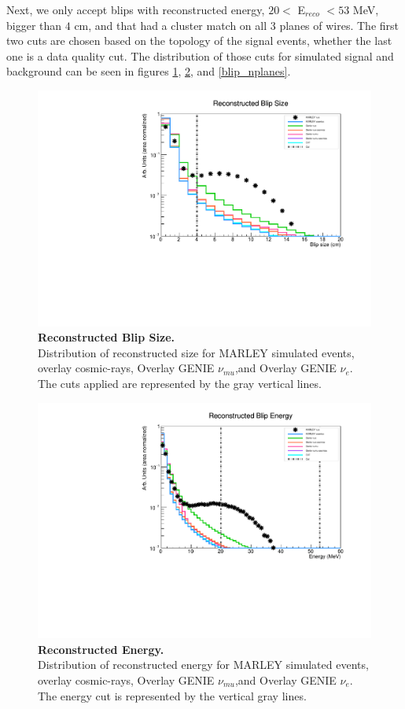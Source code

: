 Next, we only accept blips with reconstructed energy, $20 <$ E$_{reco}$ $< 53$ MeV, bigger than $4$ cm, and that had a cluster match on all 3 planes of wires. The first two cuts are chosen based on the topology of the signal events, whether the last one is a data quality cut.
The distribution of those cuts for simulated signal and background can be seen in figures \ref{blip_size}, \ref{blip_energy}, and \ref{blip_nplanes}.

\begin{figure}[h!]
    \centering
    \includegraphics[width=120mm]{Figures/blip_size.pdf}
    \caption[Reconstructed Blip Size.]{{\textbf{Reconstructed Blip Size.}}\\ Distribution of reconstructed size for MARLEY simulated events, overlay cosmic-rays, Overlay GENIE $\nu_{mu}$,and Overlay GENIE $\nu_{e}$. The cuts applied are represented by the gray vertical lines.}
    \label{blip_size}
\end{figure}

\begin{figure}[h!]
    \centering
    \includegraphics[width=120mm]{Figures/Energy_MC.pdf}
    \caption[Reconstructed Energy.]{{\textbf{Reconstructed Energy.}}\\ Distribution of reconstructed energy for MARLEY simulated events, overlay cosmic-rays, Overlay GENIE $\nu_{mu}$,and Overlay GENIE $\nu_{e}$. The energy cut is represented by the vertical gray lines.}
    \label{blip_energy}
\end{figure}

